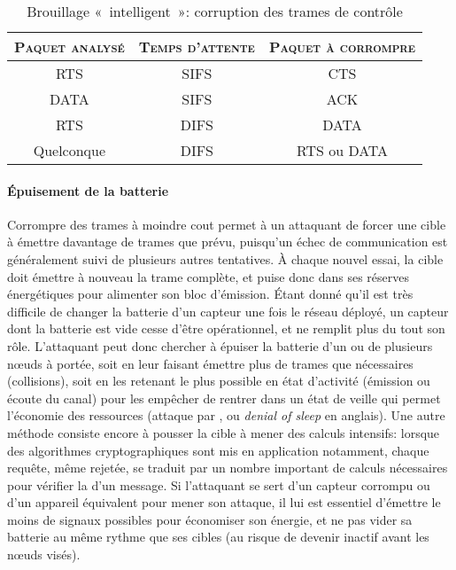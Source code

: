 
\begin{table}[!ht]
    \caption{Brouillage « intelligent »: corruption des trames de contrôle}\label{ea:tab:smartjam}
    \centering
    \medskip
    \begin{tabular}{c c c}
        \toprule
        \textsc{Paquet analysé} & \textsc{Temps d'attente} & \textsc{Paquet à corrompre}\\
        \midrule
        RTS & SIFS & CTS\\
        DATA & SIFS & ACK\\
        RTS & DIFS & DATA\\
        Quelconque & DIFS & RTS ou DATA\\
        \bottomrule
    \end{tabular}
\end{table}

        \paragraph{Épuisement de la batterie}
Corrompre des trames à moindre cout permet à un attaquant de forcer une cible à émettre davantage de trames que prévu, puisqu'un échec de communication est généralement suivi de plusieurs autres tentatives.
À chaque nouvel essai, la cible doit émettre à nouveau la trame complète, et puise donc dans ses réserves énergétiques pour alimenter son bloc d'émission.
Étant donné qu'il est très difficile de changer la batterie d'un capteur une fois le réseau déployé, un capteur dont la batterie est vide cesse d'être opérationnel, et ne remplit plus du tout son rôle.
L'attaquant peut donc chercher à épuiser la batterie d'un ou de plusieurs nœuds à portée, soit en leur faisant émettre plus de trames que nécessaires (collisions), soit en les retenant le plus possible en état d'activité (émission ou écoute du canal) pour les empêcher de rentrer dans un état de veille qui permet l'économie des ressources (attaque par , ou \textit{denial of sleep} en anglais).
Une autre méthode consiste encore à pousser la cible à mener des calculs intensifs: lorsque des algorithmes cryptographiques sont mis en application notamment, chaque requête, même rejetée, se traduit par un nombre important de calculs nécessaires pour vérifier la  d'un message.
Si l'attaquant se sert d'un capteur corrompu ou d'un appareil équivalent pour mener son attaque, il lui est essentiel d'émettre le moins de signaux possibles pour économiser son énergie, et ne pas vider sa batterie au même rythme que ses cibles (au risque de devenir inactif avant les nœuds visés).

